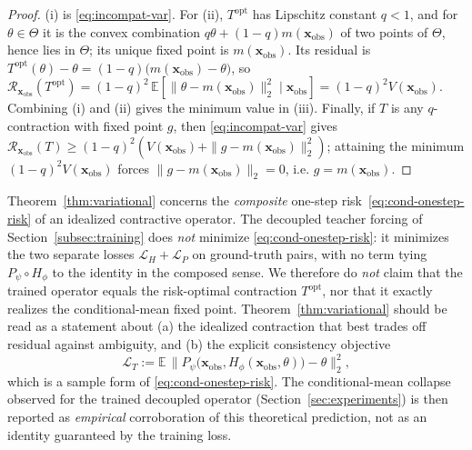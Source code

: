 \begin{proof}
(i) is \eqref{eq:incompat-var}. For (ii), $T^{\mathrm{opt}}$ has Lipschitz constant $q<1$, and for $\theta\in\Theta$ it is the convex combination $q\theta+(1-q)m(\mathbf{x}_\mathrm{obs})$ of two points of $\Theta$, hence lies in $\Theta$; its unique fixed point is $m(\mathbf{x}_\mathrm{obs})$. Its residual is $T^{\mathrm{opt}}(\theta)-\theta=(1-q)\big(m(\mathbf{x}_\mathrm{obs})-\theta\big)$, so $\mathcal{R}_{\mathbf{x}_\mathrm{obs}}(T^{\mathrm{opt}})=(1-q)^2\,\mathbb{E}[\|\theta-m(\mathbf{x}_\mathrm{obs})\|_2^2\mid\mathbf{x}_\mathrm{obs}]=(1-q)^2V(\mathbf{x}_\mathrm{obs})$. Combining (i) and (ii) gives the minimum value in (iii). Finally, if $T$ is any $q$-contraction with fixed point $g$, then \eqref{eq:incompat-var} gives $\mathcal{R}_{\mathbf{x}_\mathrm{obs}}(T)\ge (1-q)^2(V(\mathbf{x}_\mathrm{obs})+\|g-m(\mathbf{x}_\mathrm{obs})\|_2^2)$; attaining the minimum $(1-q)^2V(\mathbf{x}_\mathrm{obs})$ forces $\|g-m(\mathbf{x}_\mathrm{obs})\|_2=0$, i.e. $g=m(\mathbf{x}_\mathrm{obs})$.
\end{proof}

\begin{remark}
\label{rem:objective-gap}
Theorem~\ref{thm:variational} concerns the \emph{composite} one-step risk~\eqref{eq:cond-onestep-risk} of an idealized contractive operator. The decoupled teacher forcing of Section~\ref{subsec:training} does \emph{not} minimize \eqref{eq:cond-onestep-risk}: it minimizes the two separate losses $\mathcal{L}_H+\mathcal{L}_P$ on ground-truth pairs, with no term tying $P_\psi\!\circ\!H_\phi$ to the identity in the composed sense. We therefore do \emph{not} claim that the trained operator equals the risk-optimal contraction $T^{\mathrm{opt}}$, nor that it exactly realizes the conditional-mean fixed point. Theorem~\ref{thm:variational} should be read as a statement about (a) the idealized contraction that best trades off residual against ambiguity, and (b) the explicit consistency objective
\begin{equation}
\label{eq:consistency-loss}
\mathcal{L}_T := \mathbb{E}\,\big\|P_\psi\big(\mathbf{x}_\mathrm{obs},H_\phi(\mathbf{x}_\mathrm{obs},\theta)\big)-\theta\big\|_2^2,
\end{equation}
which is a sample form of \eqref{eq:cond-onestep-risk}. The conditional-mean collapse observed for the trained decoupled operator (Section~\ref{sec:experiments}) is then reported as \emph{empirical} corroboration of this theoretical prediction, not as an identity guaranteed by the training loss.
\end{remark}

